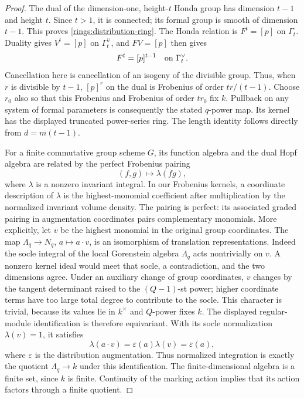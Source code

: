 \begin{proof}
The dual of the dimension-one, height-$t$ Honda group has
dimension $t-1$ and height $t$.  Since $t>1$, it is connected;
its formal group is smooth of dimension $t-1$.  This proves
\eqref{rings:distribution-ring}.  The Honda relation is
$F^t=[p]$ on $\Gamma_t$.  Duality gives $V^t=[p]$ on
$\Gamma_t^\vee$, and $FV=[p]$ then gives
\[
 F^t=[p]^{t-1}\quad\hbox{on }\Gamma_t^\vee.
\]
Cancellation here is cancellation of an isogeny of the
divisible group.  Thus, when $r$ is divisible by $t-1$,
$[p]^r$ on the dual is Frobenius of order $tr/(t-1)$.
Choose $r_0$ also so that this Frobenius and Frobenius of
order $tr_0$ fix $k$.  Pullback on any system of formal
parameters is consequently the stated $q$-power map.
Its kernel has the displayed truncated power-series ring.
The length identity follows directly from $d=m(t-1)$.

For a finite commutative group scheme $G$, its function
algebra and the dual Hopf algebra are related by the
perfect Frobenius pairing
\[
 (f,g)\longmapsto\lambda(fg),
\]
where $\lambda$ is a nonzero invariant integral.  In our
Frobenius kernels, a coordinate description of $\lambda$
is the highest-monomial coefficient after multiplication
by the normalized invariant volume density.  The pairing
is perfect: its associated graded pairing in augmentation
coordinates pairs complementary monomials.  More explicitly,
let $v$ be the highest monomial in the original group
coordinates.  The map $\Lambda_q\to N_q$, $a\mapsto a\cdot v$,
is an isomorphism of translation representations.  Indeed
the socle integral of the local Gorenstein algebra
$\Lambda_q$ acts nontrivially on $v$.  A nonzero kernel
ideal would meet that socle, a contradiction, and the two
dimensions agree.  Under an auxiliary change of group
coordinates, $v$ changes by the tangent determinant
raised to the $(Q-1)$-st power; higher coordinate terms
have too large total degree to contribute to the socle.
This character is trivial, because its values lie in
$k^\times$ and $Q$-power fixes $k$.  The displayed
regular-module identification is therefore equivariant.
With its socle normalization $\lambda(v)=1$, it satisfies
\[
 \lambda(a\cdot v)=\varepsilon(a)\lambda(v)=\varepsilon(a),
\]
where $\varepsilon$ is the distribution augmentation.
Thus normalized integration is exactly the quotient
$\Lambda_q\to k$ under this identification.
The
finite-dimensional algebra is a finite set, since $k$
is finite.  Continuity of the marking action implies
that its action factors through a finite quotient.
\end{proof}

